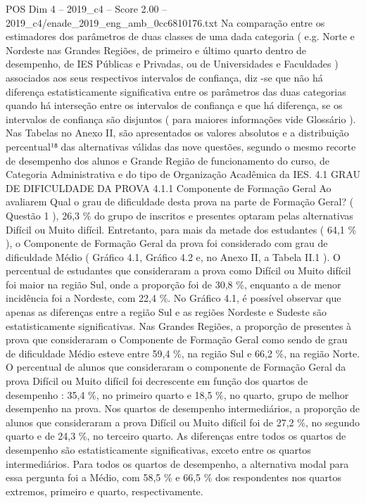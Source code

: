 \begin{textsample}{POS Dim 4 – 2019\_c4 – Score 2.00 – 2019\_c4/enade\_2019\_eng\_amb\_0cc6810176.txt}
Na comparação entre os estimadores dos parâmetros de duas classes de uma dada categoria ( e.g.
Norte e Nordeste nas Grandes Regiões, de primeiro e último quarto dentro de desempenho, de IES Públicas e Privadas, ou de Universidades e Faculdades ) associados aos seus respectivos intervalos de confiança, diz -se que não há diferença estatisticamente significativa entre os parâmetros das duas categorias quando há interseção entre os intervalos de confiança e que há diferença, se os intervalos de confiança são disjuntos ( para maiores informações vide Glossário ).
Nas Tabelas no Anexo II, são apresentados os valores absolutos e a distribuição percentual¹⁸ das alternativas válidas das nove questões, segundo o mesmo recorte de desempenho dos alunos e Grande Região de funcionamento do curso, de Categoria Administrativa e do tipo de Organização Acadêmica da IES. 4.1 GRAU DE DIFICULDADE DA PROVA 4.1.1 Componente de Formação Geral Ao avaliarem Qual o grau de dificuldade desta prova na parte de Formação Geral? ( Questão 1 ), 26,3 \% do grupo de inscritos e presentes optaram pelas alternativas Difícil ou Muito difícil.
Entretanto, para mais da metade dos estudantes ( 64,1 \% ), o Componente de Formação Geral da prova foi considerado com grau de dificuldade Médio ( Gráfico 4.1, Gráfico 4.2 e, no Anexo II, a Tabela II.1 ).
O percentual de estudantes que consideraram a prova como Difícil ou Muito difícil foi maior na região Sul, onde a proporção foi de 30,8 \%, enquanto a de menor incidência foi a Nordeste, com 22,4 \%.
No Gráfico 4.1, é possível observar que apenas as diferenças entre a região Sul e as regiões Nordeste e Sudeste são estatisticamente significativas.
Nas Grandes Regiões, a proporção de presentes à prova que consideraram o Componente de Formação Geral como sendo de grau de dificuldade Médio esteve entre 59,4 \%, na região Sul e 66,2 \%, na região Norte.
O percentual de alunos que consideraram o componente de Formação Geral da prova Difícil ou Muito difícil foi decrescente em função dos quartos de desempenho : 35,4 \%, no primeiro quarto e 18,5 \%, no quarto, grupo de melhor desempenho na prova.
Nos quartos de desempenho intermediários, a proporção de alunos que consideraram a prova Difícil ou Muito difícil foi de 27,2 \%, no segundo quarto e de 24,3 \%, no terceiro quarto.
As diferenças entre todos os quartos de desempenho são estatisticamente significativas, exceto entre os quartos intermediários.
Para todos os quartos de desempenho, a alternativa modal para essa pergunta foi a Médio, com 58,5 \% e 66,5 \% dos respondentes nos quartos extremos, primeiro e quarto, respectivamente.

\end{textsample}
